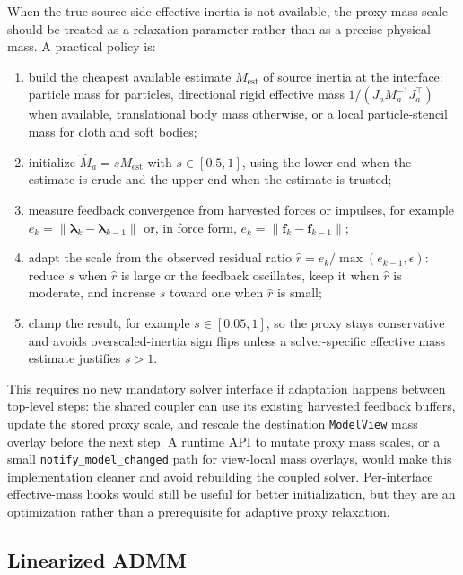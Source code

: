 \documentclass[11pt]{article}
\newcommand{\lam}{\bm\lambda}
\newcommand{\Ja}{J_a}
\newcommand{\Ma}{M_a}
\newcommand{\Mhat}{\widehat M_a}
\begin{document}
When the true source-side effective inertia is not available, the proxy mass scale
should be treated as a relaxation parameter rather than as a precise physical mass.
A practical policy is:
\begin{enumerate}
\item build the cheapest available estimate $M_{\mathrm{est}}$ of source inertia at
      the interface: particle mass for particles, directional rigid effective mass
      $1/(\Ja\Ma^{-1}\Ja^\top)$ when available, translational body mass otherwise,
      or a local particle-stencil mass for cloth and soft bodies;
\item initialize $\Mhat=sM_{\mathrm{est}}$ with $s\in[0.5,1]$, using the lower end
      when the estimate is crude and the upper end when the estimate is trusted;
\item measure feedback convergence from harvested forces or impulses, for example
      $e_k=\|\lam_k-\lam_{k-1}\|$ or, in force form,
      $e_k=\|\mathbf f_k-\mathbf f_{k-1}\|$;
\item adapt the scale from the observed residual ratio
      $\hat r=e_k/\max(e_{k-1},\epsilon)$: reduce $s$ when $\hat r$ is large or the
      feedback oscillates, keep it when $\hat r$ is moderate, and increase $s$
      toward one when $\hat r$ is small;
\item clamp the result, for example $s\in[0.05,1]$, so the proxy stays conservative
      and avoids overscaled-inertia sign flips unless a solver-specific effective
      mass estimate justifies $s>1$.
\end{enumerate}
This requires no new mandatory solver interface if adaptation happens between
top-level steps: the shared coupler can use its existing harvested feedback buffers,
update the stored proxy scale, and rescale the destination \texttt{ModelView} mass
overlay before the next step. A runtime API to mutate proxy mass scales, or a small
\texttt{notify\_model\_changed} path for view-local mass overlays, would make this
implementation cleaner and avoid rebuilding the coupled solver. Per-interface
effective-mass hooks would still be useful for better initialization, but they are an
optimization rather than a prerequisite for adaptive proxy relaxation.

\subsection{Linearized ADMM}
\end{document}
